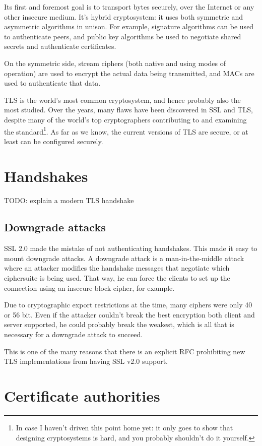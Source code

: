 \documentclass[11pt,ebook,table,dvipsnames]{memoir}
\begin{document}
Its first and foremost goal\cite{tls12} is to transport bytes
securely, over the Internet or any other insecure medium. It's hybrid
cryptosystem: it uses both symmetric and asymmetric algorithms in
unison. For example, signature algorithms can be used to authenticate
peers, and public key algorithms be used to negotiate shared secrets
and authenticate certificates.

On the symmetric side, stream ciphers (both native and using modes of
operation) are used to encrypt the actual data being transmitted, and
MACs are used to authenticate that data.

TLS is the world's most common cryptosystem, and hence probably also
the most studied. Over the years, many flaws have been discovered in
SSL and TLS, despite many of the world's top cryptographers
contributing to and examining the standard\footnote{In case I haven't
driven this point home yet: it only goes to show that designing
cryptosystems is hard, and you probably shouldn't do it yourself.}. As
far as we know, the current versions of TLS are secure, or at least
can be configured securely.
\section{Handshakes}
\label{sec-3-1-2}

TODO: explain a modern TLS handshake

\subsection{Downgrade attacks}
\label{sec-3-1-2-1}

SSL 2.0 made the mistake of not authenticating handshakes. This made
it easy to mount downgrade attacks. A downgrade attack is a
man-in-the-middle attack where an attacker modifies the handshake
messages that negotiate which ciphersuite is being used. That way, he
can force the clients to set up the connection using an insecure block
cipher, for example.

Due to cryptographic export restrictions at the time, many ciphers
were only 40 or 56 bit. Even if the attacker couldn't break the best
encryption both client and server supported, he could probably break
the weakest, which is all that is necessary for a downgrade attack to
succeed.

This is one of the many reasons that there is an explicit
RFC\cite{turner:prohibitssl20} prohibiting new TLS implementations
from having SSL v2.0 support.
\section{Certificate authorities}
\label{sec-3-1-3}
\end{document}
